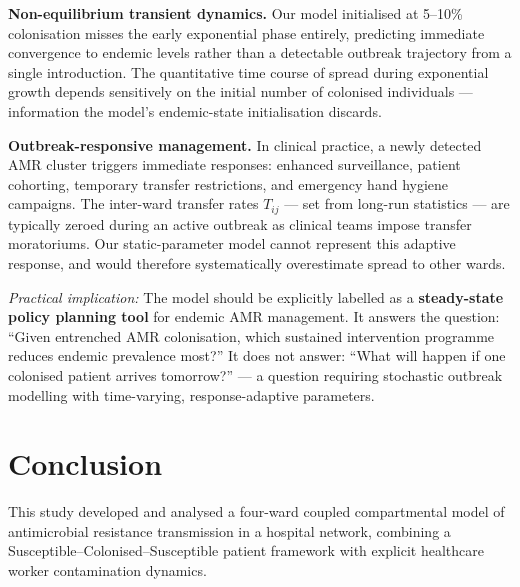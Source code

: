 \documentclass[12pt,a4paper]{article}
\begin{document}
\textbf{Non-equilibrium transient dynamics.} Our model initialised at 5--10\% colonisation misses the early exponential phase entirely, predicting immediate convergence to endemic levels rather than a detectable outbreak trajectory from a single introduction. The quantitative time course of spread during exponential growth depends sensitively on the initial number of colonised individuals --- information the model's endemic-state initialisation discards.

\textbf{Outbreak-responsive management.} In clinical practice, a newly detected AMR cluster triggers immediate responses: enhanced surveillance, patient cohorting, temporary transfer restrictions, and emergency hand hygiene campaigns. The inter-ward transfer rates $T_{ij}$ --- set from long-run statistics --- are typically zeroed during an active outbreak as clinical teams impose transfer moratoriums. Our static-parameter model cannot represent this adaptive response, and would therefore systematically overestimate spread to other wards.

\textit{Practical implication:} The model should be explicitly labelled as a \textbf{steady-state policy planning tool} for endemic AMR management. It answers the question: ``Given entrenched AMR colonisation, which sustained intervention programme reduces endemic prevalence most?'' It does not answer: ``What will happen if one colonised patient arrives tomorrow?'' --- a question requiring stochastic outbreak modelling with time-varying, response-adaptive parameters.

\section{Conclusion}

This study developed and analysed a four-ward coupled compartmental model of antimicrobial resistance transmission in a hospital network, combining a Susceptible--Colonised--Susceptible patient framework with explicit healthcare worker contamination dynamics.
\end{document}
